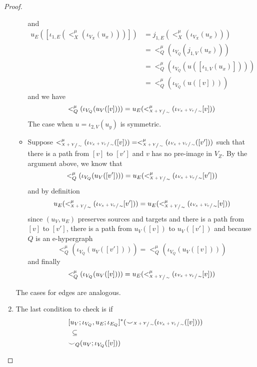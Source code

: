 \begin{proof}
\begin{enumerate}
\begin{itemize}
            and
            \begin{align*}
                u_{E}([\iota_{1,E}(<_{X}^{\mu}(\iota_{V_{X}}(u_{x})))]) &= j_{1,E}(<_{X}^{\mu}(\iota_{V_{X}}(u_{x})))\\
                &= <_{Q}^{\mu}(\iota_{V_{Q}}(j_{1,V}(u_{x})))\\
                &= <_{Q}^{\mu}(\iota_{V_{Q}}(u([\iota_{1,V}(u_{x})])))\\
                &= <_{Q}^{\mu}(\iota_{V_{Q}}(u([v])))
            \end{align*}
            and we have
            \[
                <^{\mu}_{Q}(\iota_{V_{Q}}(u_{V}([v]))) = u_{E}(<^{\mu}_{\sfrac{X+Y}{\sim}}(\iota_{\sfrac{V_{X} + V_{Y}}{\sim}}[v]))
            \]
            The case when $u = \iota_{2,V}(u_{y})$ is symmetric.
        \item Suppose $<_{\sfrac{X+Y}{\sim}}^{\mu}(\iota_{\sfrac{V_{X} + V_{Y}}{\sim}}([v])) = <_{\sfrac{X+Y}{\sim}}^{\mu}(\iota_{\sfrac{V_{X} + V_{Y}}{\sim}}([v']))$ such that there is a path from $[v]$ to $[v']$ and $v$ has no pre-image in $V_{Z}$.
              By the argument above, we know that
              \[
                <^{\mu}_{Q}(\iota_{V_{Q}}(u_{V}([v']))) = u_{E}(<^{\mu}_{\sfrac{X+Y}{\sim}}(\iota_{\sfrac{V_{X} + V_{Y}}{\sim}}[v']))
              \]
              and by definition
              \[
                u_{E}(<^{\mu}_{\sfrac{X+Y}{\sim}}(\iota_{\sfrac{V_{X} + V_{Y}}{\sim}}[v'])) = u_{E}(<^{\mu}_{\sfrac{X+Y}{\sim}}(\iota_{\sfrac{V_{X} + V_{Y}}{\sim}}[v]))
              \]
              since $(u_{V},u_{E})$ preserves sources and targets and there is a path from $[v]$ to $[v']$, there is a path from $u_{V}([v])$ to $u_{V}([v'])$ and because $Q$ is an e-hypergraph
              \[
                <^{\mu}_{Q}(\iota_{V_{Q}}(u_{V}([v']))) = <^{\mu}_{Q}(\iota_{V_{Q}}(u_{V}([v])))
              \]
              and finally
              \[
                <^{\mu}_{Q}(\iota_{V_{Q}}(u_{V}([v]))) = u_{E}(<^{\mu}_{\sfrac{X+Y}{\sim}}(\iota_{\sfrac{V_{X} + V_{Y}}{\sim}}[v]))
              \]
        \end{itemize}
    The cases for edges are analogous.
    \item The last condition to check is if
    \begin{align*}
    &[u_{V};\iota_{V_{Q}}, u_{E};\iota_{E_{Q}}]^{*}(\consistency_{\sfrac{X+Y}{\sim}}(\iota_{\sfrac{V_{X} + V_{Y}}{\sim}}([v])))\\
    &\;\subseteq\\
    &\consistency_{Q}(u_{V};\iota_{V_{Q}}([v]))

\end{align*}
\end{enumerate}
\end{proof}

